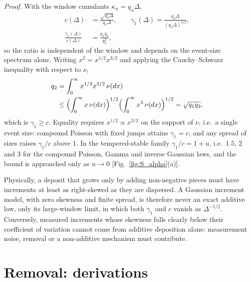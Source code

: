 \documentclass[preprint,12pt]{elsarticle}
\begin{document}
\emph{Proof.}
With the window cumulants $\kappa_n=q_n\Delta$,
\begin{equation}
\begin{aligned}
  c(\Delta)&=\frac{\sqrt{q_2\Delta}}{q_1\Delta},\qquad
  \gamma_1(\Delta)=\frac{q_3\Delta}{(q_2\Delta)^{3/2}},\\
  \frac{\gamma_1(\Delta)}{c(\Delta)}&=\frac{q_1q_3}{q_2^{2}},
\end{aligned}
  \label{eq:S_skew_ratio}
\end{equation}
so the ratio is independent of the window and depends on the event-size
spectrum alone. Writing $x^2=x^{1/2}x^{3/2}$ and applying the
Cauchy--Schwarz inequality with respect to $\nu$,
\begin{equation}
\begin{aligned}
  q_2&=\int_0^\infty x^{1/2}x^{3/2}\,\nu(dx)\\
  &\le\Bigl(\int_0^\infty x\,\nu(dx)\Bigr)^{1/2}
     \Bigl(\int_0^\infty x^{3}\,\nu(dx)\Bigr)^{1/2}
  =\sqrt{q_1q_3},
\end{aligned}
\end{equation}
which is $\gamma_1\ge c$. Equality requires $x^{1/2}\propto x^{3/2}$ on the
support of $\nu$, i.e.\ a single event size: compound Poisson with fixed
jumps attains $\gamma_1=c$, and any spread of sizes raises $\gamma_1/c$
above $1$. In the tempered-stable family $\gamma_1/c=1+u$, i.e.\ $1.5$, $2$
and $3$ for the compound Poisson, Gamma and inverse Gaussian laws, and the
bound is approached only as $u\to0$ [Fig.~\ref{fig:S_alpha}(a)].

Physically, a deposit that grows only by adding non-negative pieces must
have increments at least as right-skewed as they are dispersed. A Gaussian
increment model, with zero skewness and finite spread, is therefore never
an exact additive law, only its large-window limit, in which both
$\gamma_1$ and $c$ vanish as $\Delta^{-1/2}$. Conversely, measured
increments whose skewness falls clearly below their coefficient of
variation cannot come from additive deposition alone: measurement noise,
removal or a non-additive mechanism must contribute.

\section{Removal: derivations}
\label{app:removal}

\label{app:linear_removal}
\end{document}
